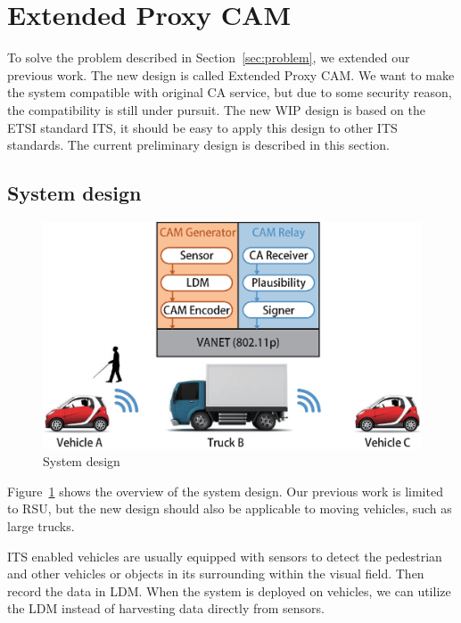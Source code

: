 \section{Extended Proxy CAM} \label{sec:iproxy_cam}

To solve the problem described in Section~\ref{sec:problem},
we extended our previous work.
The new design is called Extended Proxy CAM.
We want to make the system compatible with original CA service,
but due to some security reason, the compatibility is still under pursuit.
The new WIP design is based on the ETSI standard ITS,
it should be easy to apply this design to other ITS standards.
The current preliminary design is described in this section.

\subsection{System design}

\begin{figure}[htbp]
    \begin{center}
        \includegraphics[width=0.85\linewidth]{figures/exProxyCAM.eps}
        \caption{System design}
        \label{fig:system_design}
    \end{center}
\end{figure}

Figure~\ref{fig:system_design} shows the overview of the system design.
Our previous work is limited to RSU, but the new design should also be applicable to moving vehicles, such as large trucks.

ITS enabled vehicles are usually equipped with sensors to detect the pedestrian
and other vehicles or objects in its surrounding within the visual field.
Then record the data in LDM.
When the system is deployed on vehicles, we can utilize the LDM instead of harvesting data directly from sensors.

